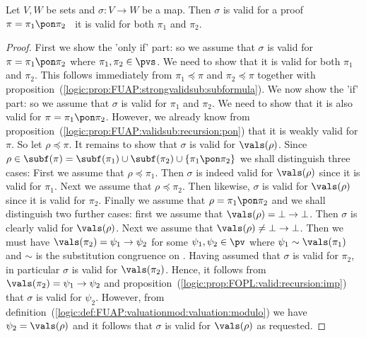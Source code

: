 \begin{prop}\label{logic:prop:FUAP:strongvalidsub:recursion:pon}
Let $V, W$ be sets and $\sigma:V\to W$ be a map. Then $\sigma$ is
valid for a proof $\pi=\pi_{1}\pon\pi_{2}$ \ifand\ it is valid for
both $\pi_{1}$ and $\pi_{2}$.
\end{prop}
\begin{proof}
First we show the 'only if' part: so we assume that $\sigma$ is
valid for $\pi=\pi_{1}\pon\pi_{2}$ where $\pi_{1},\pi_{2}\in\pvs$.
We need to show that it is valid for both $\pi_{1}$ and $\pi_{2}$.
This follows immediately from $\pi_{1}\preceq\pi$ and
$\pi_{2}\preceq\pi$ together with
proposition~(\ref{logic:prop:FUAP:strongvalidsub:subformula}). We
now show the 'if' part: so we assume that $\sigma$ is valid for
$\pi_{1}$ and $\pi_{2}$. We need to show that it is also valid for
$\pi=\pi_{1}\pon\pi_{2}$. However, we already know from
proposition~(\ref{logic:prop:FUAP:validsub:recursion:pon}) that it
is weakly valid for $\pi$. So let $\rho\preceq\pi$. It remains to
show that $\sigma$ is valid for $\vals(\rho)$. Since
$\rho\in\subf(\pi)=\subf(\pi_{1})\cup\subf(\pi_{2})\cup\{\pi_{1}\pon\pi_{2}\}$
we shall distinguish three cases: First we assume that
$\rho\preceq\pi_{1}$. Then $\sigma$ is indeed valid for
$\vals(\rho)$ since it is valid for $\pi_{1}$. Next we assume that
$\rho\preceq\pi_{2}$. Then likewise, $\sigma$ is valid for
$\vals(\rho)$ since it is valid for $\pi_{2}$. Finally we assume
that $\rho=\pi_{1}\pon\pi_{2}$ and we shall distinguish two further
cases: first we assume that $\vals(\rho)=\bot\to\bot$. Then $\sigma$
is clearly valid for $\vals(\rho)$. Next we assume that
$\vals(\rho)\neq\bot\to\bot$. Then we must have
$\vals(\pi_{2})=\psi_{1}\to\psi_{2}$ for some
$\psi_{1},\psi_{2}\in\pv$ where $\psi_{1}\sim\vals(\pi_{1})$ and
$\sim$ is the substitution congruence on \pv. Having assumed that
$\sigma$ is valid for $\pi_{2}$, in particular $\sigma$ is valid for
$\vals(\pi_{2})$. Hence, it follows from
$\vals(\pi_{2})=\psi_{1}\to\psi_{2}$ and
proposition~(\ref{logic:prop:FOPL:valid:recursion:imp}) that
$\sigma$ is valid for $\psi_{2}$. However, from
definition~(\ref{logic:def:FUAP:valuationmod:valuation:modulo}) we
have $\psi_{2}=\vals(\rho)$ and it follows that $\sigma$ is valid
for $\vals(\rho)$ as requested.
\end{proof}

